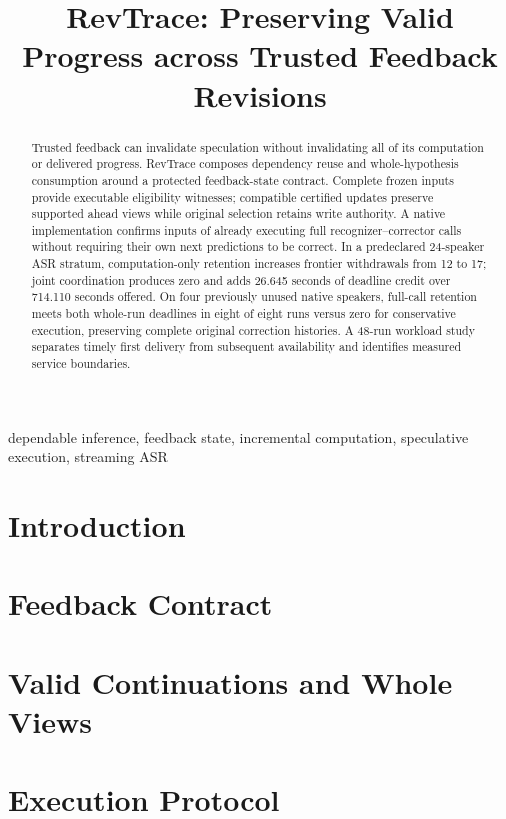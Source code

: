 \documentclass[conference,10pt]{IEEEtran}
\begin{document}
\title{RevTrace: Preserving Valid Progress across Trusted Feedback Revisions}
\author{}
\maketitle
\begin{abstract}
Trusted feedback can invalidate speculation without invalidating all of its
computation or delivered progress. RevTrace composes dependency reuse and
whole-hypothesis consumption around a protected feedback-state contract.
Complete frozen inputs provide executable eligibility witnesses; compatible
certified updates preserve supported ahead views while original selection
retains write authority. A native implementation confirms inputs of already
executing full recognizer--corrector calls without requiring their own next
predictions to be correct. In a predeclared 24-speaker ASR stratum,
computation-only retention increases frontier withdrawals from 12 to 17;
joint coordination produces zero and adds 26.645 seconds of deadline credit
over 714.110 seconds offered. On four previously unused native speakers,
full-call retention meets both whole-run deadlines in eight of eight runs
versus zero for conservative execution, preserving complete original
correction histories. A 48-run workload study separates
timely first delivery from subsequent availability and identifies measured
service boundaries.
\end{abstract}
\begin{IEEEkeywords}
dependable inference, feedback state, incremental computation, speculative execution, streaming ASR
\end{IEEEkeywords}
\section{Introduction}\label{sec:intro}

\section{Feedback Contract}\label{sec:contract}

\section{Valid Continuations and Whole Views}\label{sec:continuation}


\section{Execution Protocol}\label{sec:protocol}

\end{document}

